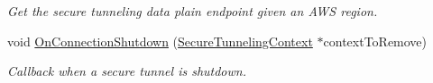 \begin{DoxyCompactItemize}
\begin{DoxyCompactList}\small\item\em Get the secure tunneling data plain endpoint given an A\+WS region. \end{DoxyCompactList}\item 
void \hyperlink{class_aws_1_1_iot_1_1_device_client_1_1_secure_tunneling_1_1_secure_tunneling_feature_afb34e3a40f628b963992e5187b8fc596}{On\+Connection\+Shutdown} (\hyperlink{class_aws_1_1_iot_1_1_device_client_1_1_secure_tunneling_1_1_secure_tunneling_context}{Secure\+Tunneling\+Context} $\ast$context\+To\+Remove)
\begin{DoxyCompactList}\small\item\em Callback when a secure tunnel is shutdown. \end{DoxyCompactList}\end{DoxyCompactItemize}
